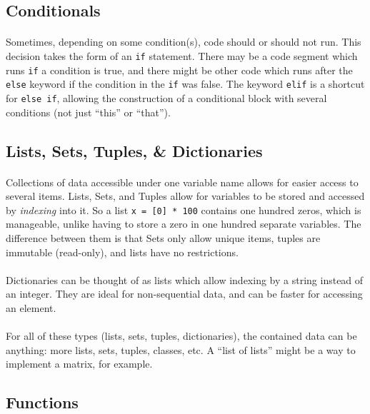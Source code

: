 \documentclass[letter,10pt]{article}
\begin{document}
\subsection{Conditionals}
\paragraph{}Sometimes, depending on some condition(s), code should or should not run. This decision takes the form of an \verb|if| statement. There may be a code segment which runs \verb|if| a condition is true, and there might be other code which runs after the \verb|else| keyword if the condition in the \verb|if| was false. The keyword \verb|elif| is a shortcut for \verb|else if|, allowing the construction of a conditional block with several conditions (not just ``this'' or ``that'').

\subsection{Lists, Sets, Tuples, \& Dictionaries}
\paragraph{}Collections of data accessible under one variable name allows for easier access to several items. Lists, Sets, and Tuples allow for variables to be stored and accessed by \textit{indexing} into it. So a list \verb|x = [0] * 100| contains one hundred zeros, which is manageable, unlike having to store a zero in one hundred separate variables. The difference between them is that Sets only allow unique items, tuples are immutable (read-only), and lists have no restrictions.

\paragraph{}Dictionaries can be thought of as lists which allow indexing by a string instead of an integer. They are ideal for non-sequential data, and can be faster for accessing an element.

\paragraph{}For all of these types (lists, sets, tuples, dictionaries), the contained data can be anything: more lists, sets, tuples, classes, etc. A ``list of lists'' might be a way to implement a matrix, for example.

\subsection{Functions}
\end{document}

